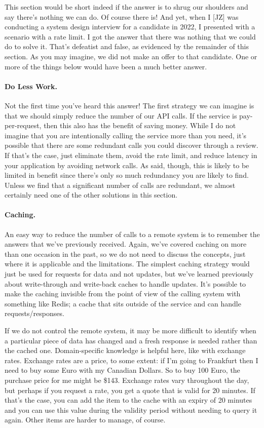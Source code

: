 This section would be short indeed if the answer is to shrug our shoulders and say there's nothing we can do. Of course there is! And yet, when I [JZ] was conducting a system design interview for a candidate in 2022, I presented with a scenario with a rate limit. I got the answer that there was nothing that we could do to solve it. That's defeatist and false, as evidenced by the remainder of this section. As you may imagine, we did not make an offer to that candidate. One or more of the things below would have been a much better answer.



\paragraph{Do Less Work.}
Not the first time you've heard this answer! The first strategy we can imagine is that we should simply reduce the number of our API calls. If the service is pay-per-request, then this also has the benefit of saving money. While I do not imagine that you are intentionally calling the service more than you need, it's possible that there are some redundant calls you could discover through a review. If that's the case, just eliminate them, avoid the rate limit, and reduce latency in your application by avoiding network calls. As said, though, this is likely to be limited in benefit since there's only so much redundancy you are likely to find. Unless we find that a significant number of calls are redundant, we almost certainly need one of the other solutions in this section. 

\paragraph{Caching.}
An easy way to reduce the number of calls to a remote system is to remember the answers that we've previously received. Again, we've covered caching on more than one occasion in the past, so we do not need to discuss the concepts, just where it is applicable and the limitations. The simplest caching strategy would just be used for requests for data and not updates, but we've learned previously about write-through and write-back caches to handle updates. It's possible to make the caching invisible from the point of view of the calling system with something like Redis; a cache that sits outside of the service and can handle requests/responses. 

If we do not control the remote system, it may be more difficult to identify when a particular piece of data has changed and a fresh response is needed rather than the cached one. Domain-specific knowledge is helpful here, like with exchange rates. Exchange rates are a price, to some extent: if I'm going to Frankfurt then I need to buy some Euro with my Canadian Dollars. So to buy 100 Euro, the purchase price for me might be \$143. Exchange rates vary throughout the day, but perhaps if you request a rate, you get a quote that is valid for 20 minutes. If that's the case, you can add the item to the cache with an expiry of 20 minutes and you can use this value during the validity period without needing to query it again. Other items are harder to manage, of course.


